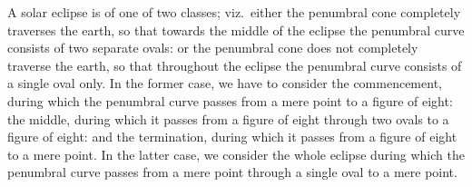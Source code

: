 \documentclass[11pt,a4paper]{article}
\begin{document}
A solar eclipse is of one of two classes; viz.\ either the penumbral cone completely traverses the earth, so that towards the middle of the eclipse the penumbral curve consists of two separate ovals: or the penumbral cone does not completely traverse the earth, so that throughout the eclipse the penumbral curve consists of a single oval only. In the former case, we have to consider the commencement, during which the penumbral curve passes from a mere point to a figure of eight: the middle, during which it passes from a figure of eight through two ovals to a figure of eight: and the termination, during which it passes from a figure of eight to a mere point. In the latter case, we consider the whole eclipse during which the penumbral curve passes from a mere point through a single oval to a mere point.

\medskip
\end{document}
